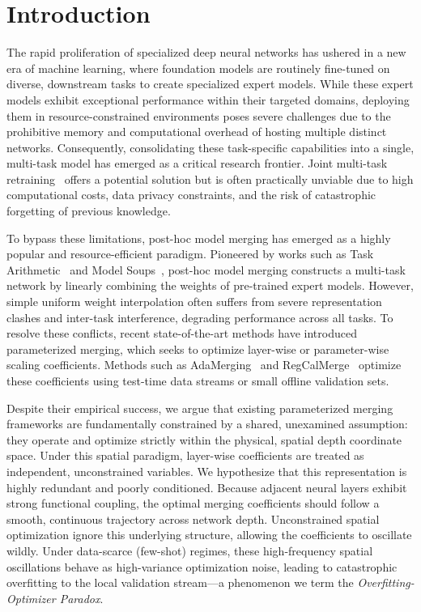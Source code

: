 \section{Introduction}
\label{sec:intro}

The rapid proliferation of specialized deep neural networks has ushered in a new era of machine learning, where foundation models are routinely fine-tuned on diverse, downstream tasks to create specialized expert models. While these expert models exhibit exceptional performance within their targeted domains, deploying them in resource-constrained environments poses severe challenges due to the prohibitive memory and computational overhead of hosting multiple distinct networks. Consequently, consolidating these task-specific capabilities into a single, multi-task model has emerged as a critical research frontier. Joint multi-task retraining~\cite{caruana1997multitask} offers a potential solution but is often practically unviable due to high computational costs, data privacy constraints, and the risk of catastrophic forgetting of previous knowledge.

To bypass these limitations, post-hoc model merging has emerged as a highly popular and resource-efficient paradigm. Pioneered by works such as Task Arithmetic~\cite{ilharco2022editing} and Model Soups~\cite{wortsman2022model}, post-hoc model merging constructs a multi-task network by linearly combining the weights of pre-trained expert models. However, simple uniform weight interpolation often suffers from severe representation clashes and inter-task interference, degrading performance across all tasks. To resolve these conflicts, recent state-of-the-art methods have introduced parameterized merging, which seeks to optimize layer-wise or parameter-wise scaling coefficients. Methods such as AdaMerging~\cite{adamerging} and RegCalMerge~\cite{regcalmerge} optimize these coefficients using test-time data streams or small offline validation sets.

Despite their empirical success, we argue that existing parameterized merging frameworks are fundamentally constrained by a shared, unexamined assumption: they operate and optimize strictly within the physical, spatial depth coordinate space. Under this spatial paradigm, layer-wise coefficients are treated as independent, unconstrained variables. We hypothesize that this representation is highly redundant and poorly conditioned. Because adjacent neural layers exhibit strong functional coupling, the optimal merging coefficients should follow a smooth, continuous trajectory across network depth. Unconstrained spatial optimization ignore this underlying structure, allowing the coefficients to oscillate wildly. Under data-scarce (few-shot) regimes, these high-frequency spatial oscillations behave as high-variance optimization noise, leading to catastrophic overfitting to the local validation stream—a phenomenon we term the \emph{Overfitting-Optimizer Paradox}.

